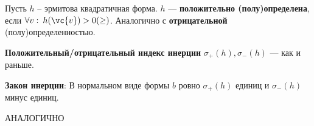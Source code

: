 \begin{to_def} 
	Пусть $h$ -- эрмитова квадратичная форма. $h$ --- \textbf{положительно (полу)определена}, если $\forall v:\: h(\vc{v}) >0 (\geq)$. Аналогично с \textbf{отрицательной} (полу)определенностью.  
\end{to_def}

\begin{to_def} 
	\textbf{Положительный/отрицательный индекс инерции} $\sigma_+(h), \sigma_-(h)$ --- как и раньше. 

	\textbf{Закон инерции}: В нормальном виде формы $b$ ровно $\sigma_+(h)$ единиц и $\sigma_-(h)$ минус единиц.
\end{to_def}

\begin{to_thr} 
	 АНАЛОГИЧНО
\end{to_thr}